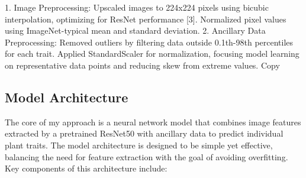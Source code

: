 \documentclass{article}
\begin{document}
1. Image Preprocessing: Upscaled images to 224x224 pixels using bicubic interpolation, optimizing for ResNet performance [3]. Normalized pixel values using ImageNet-typical mean and standard deviation.
2. Ancillary Data Preprocessing: Removed outliers by filtering data outside 0.1th-98th percentiles for each trait. Applied StandardScaler for normalization, focusing model learning on representative data points and reducing skew from extreme values.
Copy

\subsection{Model Architecture}

The core of my approach is a neural network model that combines image features extracted by a pretrained ResNet50 with ancillary data to predict individual plant traits. The model architecture is designed to be simple yet effective, balancing the need for feature extraction with the goal of avoiding overfitting.  Key components of this architecture include:
\end{document}
